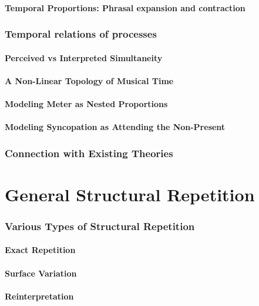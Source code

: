        \subsection{Temporal Proportions: Phrasal expansion and contraction}
        
    \section{Temporal relations of processes}
        \subsection{Perceived vs Interpreted Simultaneity}
        \subsection{A Non-Linear Topology of Musical Time}
        \subsection{Modeling Meter as Nested Proportions}
        \subsection{Modeling Syncopation as Attending the Non-Present}
    \section{Connection with Existing Theories}


\part{General Structural Repetition}
    \section{Various Types of Structural Repetition}
        \subsection{Exact Repetition}
        \subsection{Surface Variation}
        \subsection{Reinterpretation}
